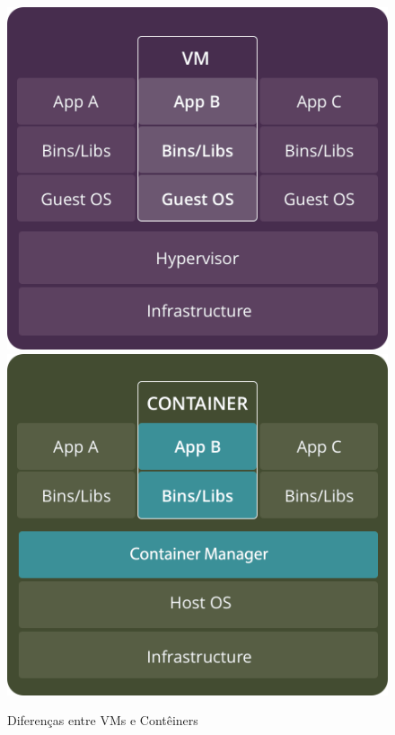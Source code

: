 	\begin{figure}[htb]
		\caption{\label{fig_circulo}Diferenças entre VMs e Contêiners}
		\begin{center}
    		\includegraphics[scale=0.20]{pictures/vms.png}
    		\includegraphics[scale=0.20]{pictures/containers.png}
		\end{center}
	\end{figure}
	
